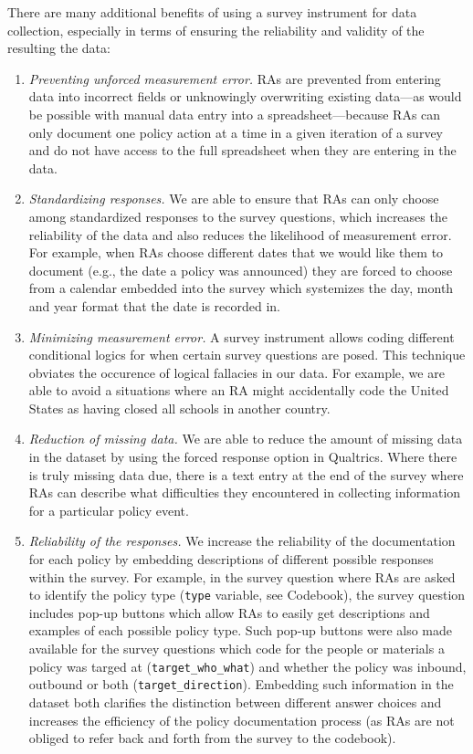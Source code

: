 \documentclass[]{article}
\begin{document}
There are many additional benefits of using a survey instrument for data collection, especially in terms of ensuring the reliability and validity of the resulting the data:

\begin{enumerate}
\def\labelenumi{\arabic{enumi}.}
\item
  \emph{Preventing unforced measurement error.} RAs are prevented from entering data into incorrect fields or unknowingly overwriting existing data---as would be possible with manual data entry into a spreadsheet---because RAs can only document one policy action at a time in a given iteration of a survey and do not have access to the full spreadsheet when they are entering in the data.
\item
  \emph{Standardizing responses.} We are able to ensure that RAs can only choose among standardized responses to the survey questions, which increases the reliability of the data and also reduces the likelihood of measurement error. For example, when RAs choose different dates that we would like them to document (e.g., the date a policy was announced) they are forced to choose from a calendar embedded into the survey which systemizes the day, month and year format that the date is recorded in.
\item
  \emph{Minimizing measurement error.} A survey instrument allows coding different conditional logics for when certain survey questions are posed. This technique obviates the occurence of logical fallacies in our data. For example, we are able to avoid a situations where an RA might accidentally code the United States as having closed all schools in another country.
\item
  \emph{Reduction of missing data.} We are able to reduce the amount of missing data in the dataset by using the forced response option in Qualtrics. Where there is truly missing data due, there is a text entry at the end of the survey where RAs can describe what difficulties they encountered in collecting information for a particular policy event.
\item
  \emph{Reliability of the responses.} We increase the reliability of the documentation for each policy by embedding descriptions of different possible responses within the survey. For example, in the survey question where RAs are asked to identify the policy type (\texttt{type} variable, see Codebook), the survey question includes pop-up buttons which allow RAs to easily get descriptions and examples of each possible policy type. Such pop-up buttons were also made available for the survey questions which code for the people or materials a policy was targed at (\texttt{target\_who\_what}) and whether the policy was inbound, outbound or both (\texttt{target\_direction}). Embedding such information in the dataset both clarifies the distinction between different answer choices and increases the efficiency of the policy documentation process (as RAs are not obliged to refer back and forth from the survey to the codebook).

\end{enumerate}
\end{document}
